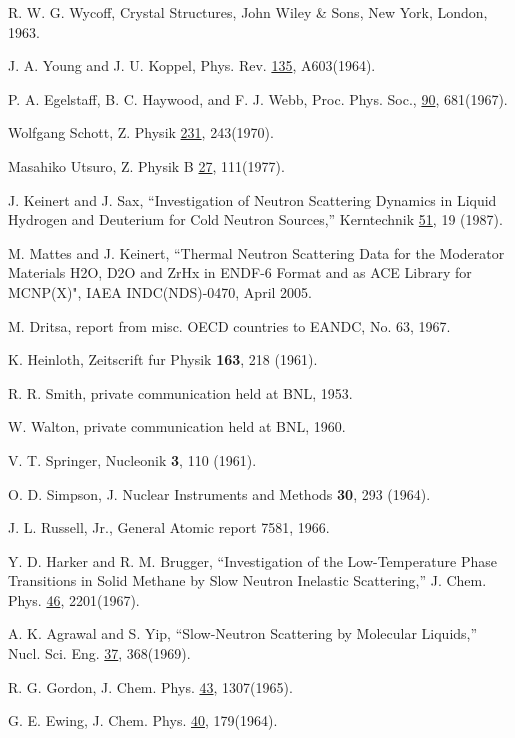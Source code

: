 \documentclass[11pt,twoside]{NJOYMan}
\begin{document}
\begin{thebibliography}{99}
\begin{singlespace}
 R. W. G. Wycoff, Crystal Structures, John Wiley \& Sons,
  New York, London, 1963.

 J. A. Young and J. U. Koppel, Phys. Rev. \underline{135},
  A603(1964).

 P. A. Egelstaff, B. C. Haywood, and F. J. Webb,
  Proc. Phys. Soc., \underline{90}, 681(1967).

 Wolfgang Schott, Z. Physik \underline{231}, 243(1970).

 Masahiko Utsuro, Z. Physik B \underline{27}, 111(1977).

 J. Keinert and J. Sax, ``Investigation of Neutron Scattering
  Dynamics in Liquid Hydrogen and Deuterium for Cold Neutron Sources,''
  Kerntechnik \underline{51}, 19 (1987).

 M. Mattes and J. Keinert, ``Thermal Neutron Scattering
  Data for the Moderator Materials H2O, D2O and ZrHx in ENDF-6 Format
  and as ACE Library for MCNP(X)", IAEA INDC(NDS)-0470, April 2005.

 M. Dritsa, report from misc. OECD countries to EANDC,
  No. 63, 1967.

 K. Heinloth, Zeitscrift fur Physik {\bf 163},
  218 (1961).

 R. R. Smith, private communication held at BNL, 1953.

 W. Walton, private communication held at BNL, 1960.

 V. T. Springer, Nucleonik {\bf 3}, 110 (1961).

 O. D. Simpson, J. Nuclear Instruments and Methods
  {\bf 30}, 293 (1964).

 J. L. Russell, Jr., General Atomic report 7581, 1966.

 Y. D. Harker and R. M. Brugger,
  ``Investigation of the Low-Temperature Phase Transitions in Solid
  Methane by Slow Neutron Inelastic Scattering,'' J. Chem. Phys.
  \underline{46}, 2201(1967).

 A. K. Agrawal and S. Yip, ``Slow-Neutron
  Scattering by Molecular Liquids,'' Nucl. Sci. Eng. \underline{37},
  368(1969).

 R. G. Gordon, J. Chem. Phys. \underline{43}, 1307(1965).

 G. E. Ewing, J. Chem. Phys. \underline{40}, 179(1964).


\end{singlespace}
\end{thebibliography}
\end{document}
